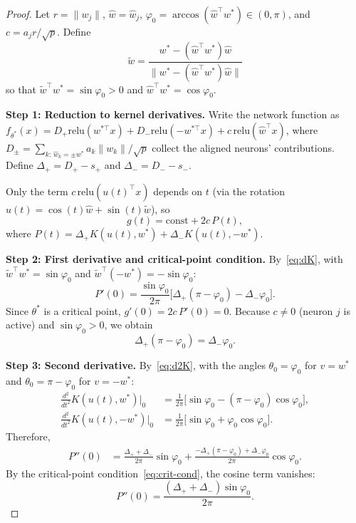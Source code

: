 \documentclass[11pt]{amsart}
\theoremstyle{definition}
\newcommand{\norm}[1]{\| #1 \|}
\newcommand{\relu}{\mathrm{relu}}
\begin{document}
\begin{proof}
Let $r = \norm{w_j}$, $\hat{w} = \hat{w}_j$,
$\varphi_0 = \arccos(\hat{w}^\top w^*) \in (0,\pi)$, and
$c = a_j r / \sqrt{p}$.  Define
\[
  \tilde{w}
  = \frac{w^* - (\hat{w}^\top w^*)\hat{w}}
         {\norm{w^* - (\hat{w}^\top w^*)\hat{w}}}
\]
so that $\tilde{w}^\top w^* = \sin\varphi_0 > 0$ and
$\hat{w}^\top w^* = \cos\varphi_0$.

\medskip
\noindent\textbf{Step 1: Reduction to kernel derivatives.}
Write the network function as
$f_{\theta^*}(x) = D_+ \relu(w^{*\top}x) + D_- \relu(-w^{*\top}x)
  + c\,\relu(\hat{w}^\top x)$,
where $D_{\pm} = \sum_{k:\,\hat{w}_k = \pm w^*} a_k\norm{w_k}/\sqrt{p}$
collect the aligned neurons' contributions.
Define $\Delta_+ = D_+ - s_+$ and $\Delta_- = D_- - s_-$.

Only the term $c\,\relu(u(t)^\top x)$ depends on $t$ (via the rotation
$u(t) = \cos(t)\hat{w} + \sin(t)\tilde{w}$), so
\begin{equation}\label{eq:g-P}
  g(t) = \text{const} + 2c\,P(t),
\end{equation}
where
$P(t) = \Delta_+ K(u(t), w^*) + \Delta_- K(u(t), -w^*)$.

\medskip
\noindent\textbf{Step 2: First derivative and critical-point condition.}
By~\eqref{eq:dK}, with $\tilde{w}^\top w^* = \sin\varphi_0$ and
$\tilde{w}^\top(-w^*) = -\sin\varphi_0$:
\[
  P'(0) = \frac{\sin\varphi_0}{2\pi}
  \bigl[\Delta_+(\pi - \varphi_0) - \Delta_-\varphi_0\bigr].
\]
Since $\theta^*$ is a critical point, $g'(0) = 2c\,P'(0) = 0$.  Because
$c \neq 0$ (neuron $j$ is active) and $\sin\varphi_0 > 0$, we obtain
\begin{equation}\label{eq:crit-cond}
  \Delta_+(\pi - \varphi_0) = \Delta_-\varphi_0.
\end{equation}

\medskip
\noindent\textbf{Step 3: Second derivative.}
By~\eqref{eq:d2K}, with the angles $\theta_0 = \varphi_0$ for $v = w^*$ and
$\theta_0 = \pi - \varphi_0$ for $v = -w^*$:
\begin{align*}
  \frac{d^2}{dt^2}K(u(t), w^*)\Big|_0
  &= \frac{1}{2\pi}\bigl[\sin\varphi_0 - (\pi-\varphi_0)\cos\varphi_0\bigr],\\
  \frac{d^2}{dt^2}K(u(t), -w^*)\Big|_0
  &= \frac{1}{2\pi}\bigl[\sin\varphi_0 + \varphi_0\cos\varphi_0\bigr].
\end{align*}
Therefore,
\begin{align*}
  P''(0)
  &= \frac{\Delta_+ + \Delta_-}{2\pi}\sin\varphi_0
     + \frac{-\Delta_+(\pi-\varphi_0) + \Delta_-\varphi_0}{2\pi}\cos\varphi_0.
\end{align*}
By the critical-point condition~\eqref{eq:crit-cond}, the cosine term vanishes:
\begin{equation}\label{eq:P2}
  P''(0) = \frac{(\Delta_+ + \Delta_-)\sin\varphi_0}{2\pi}.
\end{equation}


\end{proof}
\end{document}

